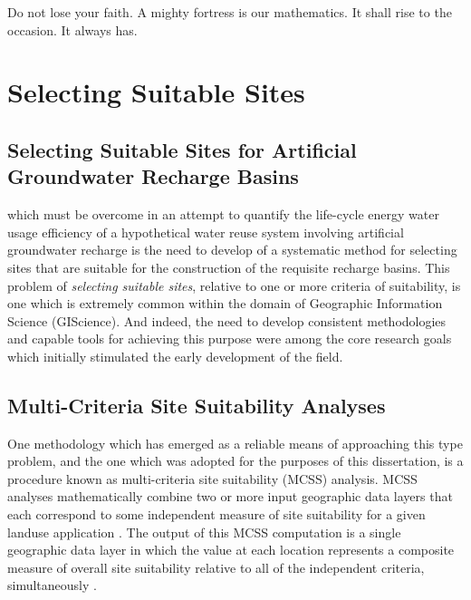 \begin{savequote}[75mm]
Do not lose your faith. A mighty fortress is our mathematics. It shall rise to the occasion. It always has. 
\end{savequote}

\chapter{Selecting Suitable Sites}
\label{chapter 1}

\newpage
 
\section{Selecting Suitable Sites for Artificial Groundwater Recharge Basins}

 which must be overcome in an attempt to quantify the life-cycle energy water usage efficiency of a hypothetical water reuse system involving artificial groundwater recharge is the need to develop of a systematic method for selecting sites that are suitable for the construction of the requisite recharge basins. This problem of \textit{selecting suitable sites}, relative to one or more criteria of suitability, is one which is extremely common within the domain of Geographic Information Science (GIScience). And indeed, the need to develop consistent methodologies and capable tools for achieving this purpose were among the core research goals which initially stimulated the early development of the field.
 
\section{Multi-Criteria Site Suitability Analyses}

One methodology which has emerged as a reliable means of approaching this type problem, and the one which was adopted for the purposes of this dissertation, is a procedure known as multi-criteria site suitability (MCSS) analysis. MCSS analyses mathematically combine two or more input geographic data layers that each correspond to some independent measure of site suitability for a given landuse application \cite{Bolstad2005}. The output of this MCSS computation is a single geographic data layer in which the value at each location represents a composite measure of overall site suitability relative to all of the independent criteria, simultaneously \cite{Hopkins1977, Collins2001}.  

